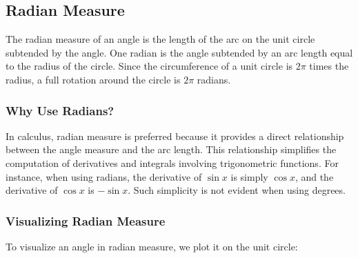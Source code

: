 \documentclass[a4paper,12pt]{book}
\begin{document}


\subsection{Radian Measure}
\label{subsec:radian_measure}

The radian measure of an angle is the length of the arc on the unit circle subtended by the angle. One radian is the angle subtended by an arc length equal to the radius of the circle. Since the circumference of a unit circle is \(2\pi\) times the radius, a full rotation around the circle is \(2\pi\) radians.

\subsubsection*{Why Use Radians?}
In calculus, radian measure is preferred because it provides a direct relationship between the angle measure and the arc length. This relationship simplifies the computation of derivatives and integrals involving trigonometric functions. For instance, when using radians, the derivative of \(\sin x\) is simply \(\cos x\), and the derivative of \(\cos x\) is \(-\sin x\). Such simplicity is not evident when using degrees.

\subsubsection*{Visualizing Radian Measure}
To visualize an angle in radian measure, we plot it on the unit circle:
\end{document}
